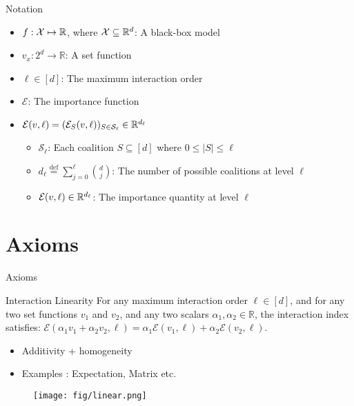 \documentclass[10pt]{beamer}
\newcommand{\f}{v}
\newcommand{\x}{x}
\newcommand{\ex}{\Expl}
\def\Expl{\mathcal{E}}
\newcommand*{\defeq}{\stackrel{\text{def}}{=}}
\begin{document}
\begin{frame}{Notation}
\begin{itemize}
    \itemsep1.5em %
    \item $f : \mathcal{X} \mapsto \mathbb{R}$, where $\mathcal{X} \subseteq \mathbb{R}^d$: A black-box model
    \item $\f_{\x} : 2^d \rightarrow \mathbb{R}$: A set function
    \item $\ell \in [d]$: The maximum interaction order
    \item $\ex$: The importance function
    \item $\ex(\f, \ell) = (\ex_{S}(\f, \ell))_{S \in \mathcal{S}_\ell} \in \R^{d_\ell}$
    \begin{itemize}
        \vspace{0.3cm}
        \itemsep1.2em
        \item $\mathcal{S}_\ell$: Each coalition $S \subseteq [d]$ where $0 \leq |S| \leq \ell$
        \item $d_{\ell} \defeq \sum_{j=0}^{\ell} \binom{d}{j}$: The number of possible coalitions at level $\ell$
        \item $\ex(\f, \ell) \in \R^{d_\ell}$: The importance quantity at level $\ell$
    \end{itemize}
\end{itemize}
\end{frame}
\section[Axioms]{Axioms}

\begin{frame}{Axioms}
    \begin{myaxiombox}{Interaction Linearity}
    For any maximum interaction order $\ell \in [d]$, and for any two set functions $\f_1$ and $\f_2$, and any two scalars $\alpha_1, \alpha_2 \in \mathbb{R}$, the interaction index satisfies: $\ex(\alpha_1 \f_1+ \alpha_2 \f_2,\ell) = \alpha_1 \ex(\f_1,\ell) + \alpha_2 \ex(\f_2,\ell)$.
    \end{myaxiombox}
    \vspace{1.5em}
    \begin{itemize}[label=\scalebox{0.5}{$\blacksquare$}]
        \item Additivity + homogeneity
        \item Examples : Expectation, Matrix etc.
    \end{itemize}
\end{frame}
\begin{frame}
    \begin{figure}[h]
    \centering
    \texttt{[image: fig/linear.png]}
    \end{figure}
\end{frame}
\end{document}

